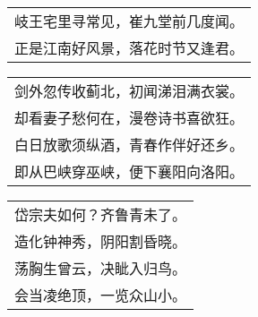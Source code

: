 \nopagebreak%
\nopagebreak%
\noindent\begin{minipage}{\linewidth}
  \vskip-3pt\begin{table}[H]
    \centering
    \begin{tabular}{@{}l@{}}
岐王宅里寻常见，崔九堂前几度闻。\\
正是江南好风景，落花时节又逢君。
    \end{tabular}
  \end{table}
\end{minipage}
\vspace{1cm}


\nopagebreak%
\nopagebreak%
\noindent\begin{minipage}{\linewidth}
  \vskip-3pt\begin{table}[H]
    \centering
    \begin{tabular}{@{}l@{}}
剑外忽传收蓟北，初闻涕泪满衣裳。\\
却看妻子愁何在，漫卷诗书喜欲狂。\\
白日放歌须纵酒，青春作伴好还乡。\\
即从巴峡穿巫峡，便下襄阳向洛阳。
    \end{tabular}
  \end{table}
\end{minipage}
\vspace{1cm}


\nopagebreak%
\nopagebreak%
\noindent\begin{minipage}{\linewidth}
  \vskip-3pt\begin{table}[H]
    \centering
    \begin{tabular}{@{}l@{}}
岱宗夫如何？齐鲁青未了。\\
造化钟神秀，阴阳割昏晓。\\
荡胸生曾云，决眦入归鸟。\\
会当凌绝顶，一览众山小。
    \end{tabular}
  \end{table}
\end{minipage}
\vspace{1cm}


